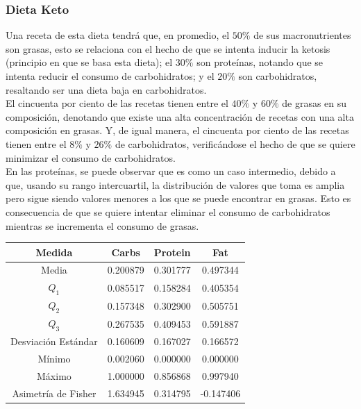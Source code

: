 \documentclass[12pt,a4paper]{article}
\begin{document}
        \subsubsection{Dieta Keto}

            Una receta de esta dieta tendrá que, en promedio, el $50\%$ de 
            sus macronutrientes son grasas, esto se relaciona con el hecho de 
            que se intenta inducir la ketosis (principio en que se basa esta         
            dieta); el $30\%$ son proteínas, notando que se intenta reducir 
            el consumo de carbohidratos; y el $20\%$ son carbohidratos, 
            resaltando ser una dieta baja en carbohidratos.\\

            El cincuenta por ciento de las recetas tienen entre el $40\%$ y 
            $60\%$ de grasas en su composición, denotando que existe una alta 
            concentración de recetas con una alta composición en grasas. Y, de 
            igual manera, el cincuenta por ciento de las recetas tienen entre 
            el $8\%$ y $26\%$ de carbohidratos, verificándose el hecho de que 
            se quiere minimizar el consumo de carbohidratos.\\

            En las proteínas, se puede observar que es como un caso intermedio, 
            debido a que, usando su rango intercuartil, la distribución de valores 
            que toma es amplia pero sigue siendo valores menores a los que se puede 
            encontrar en grasas. Esto es consecuencia de que se quiere intentar 
            eliminar el consumo de carbohidratos mientras se incrementa el consumo 
            de grasas.

            \begin{center}
                \begin{tabular}{| c | c c c |}
                    \toprule
                    Medida & Carbs & Protein & Fat \\
                    \midrule
                    Media               & 0.200879 & 0.301777 & 0.497344  \\
                    $Q_1$               & 0.085517 & 0.158284 & 0.405354  \\
                    $Q_2$               & 0.157348 & 0.302900 & 0.505751  \\
                    $Q_3$               & 0.267535 & 0.409453 & 0.591887  \\
                    Desviación Estándar & 0.160609 & 0.167027 & 0.166572  \\
                    Mínimo              & 0.002060 & 0.000000 & 0.000000  \\
                    Máximo              & 1.000000 & 0.856868 & 0.997940  \\
                    Asimetría de Fisher & 1.634945 & 0.314795 & -0.147406 \\
                    \bottomrule
                \end{tabular}
            \end{center}
\end{document}
